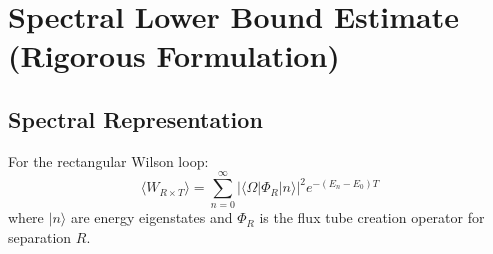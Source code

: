 \section{Spectral Lower Bound Estimate (Rigorous Formulation)}
\label{sec:spectral-lower-bound}

\subsection{Spectral Representation}

\begin{theorem}
\label{thm:spectral-wilson}
For the rectangular Wilson loop:
\[
\langle W_{R \times T} \rangle = \sum_{n=0}^\infty |\langle \Omega | \Phi_R | n \rangle|^2 e^{-(E_n - E_0)T}
\]
where $|n\rangle$ are energy eigenstates and $\Phi_R$ is the flux tube 
creation operator for separation $R$.
\end{theorem}

